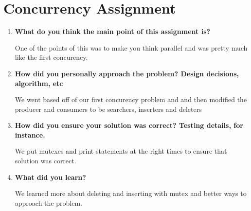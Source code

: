 \documentclass[letterpaper,10pt,titlepage,draftclsnofoot,onecolumn]{IEEEtran}
\begin{document}
\section{Concurrency Assignment}
\begin{enumerate}
\item \textbf{What do you think the main point of this assignment is?}

One of the points of this was to make you think parallel and was pretty much like the first concurency.\par

\item \textbf{How did you personally approach the problem? Design decisions, algorithm, etc}

We went based off of our first concurency problem and and then modified the producer and consumers to be searchers, inserters and deleters \par

\item \textbf{How did you ensure your solution was correct? Testing details, for instance.}

We put mutexes and print statements at the right times to ensure that solution was correct.\par

\item \textbf{What did you learn?}

We learned more about deleting and inserting with mutex and better ways to approach the problem.\par

\end{enumerate}

\nocite{*}



\end{document}

